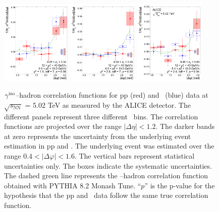 \begin{figure}
    \includegraphics[width=0.3\textwidth]{Data_Analysis/gammahadron/Cs_Final_Indv_pT_0_zT_5.pdf}        
    \includegraphics[width=0.3\textwidth]{Data_Analysis/gammahadron/Cs_Final_Indv_pT_0_zT_6.pdf}        
    \includegraphics[width=0.3\textwidth]{Data_Analysis/gammahadron/Cs_Final_Indv_pT_0_zT_7.pdf}
    \caption{$\gamma^\mathrm{iso}$--hadron correlation functions for pp (red) and \pPb~(blue) data at $\sqrt{s_\mathrm{NN}}$ = 5.02 TeV as measured by the ALICE detector. The different panels represent three different \zt~bins. The correlation functions are projected over the range $|\Delta\eta| < 1.2$. The darker bands at zero represents the uncertainty from the underlying event estimation in pp and \pPb. The underlying event was estimated over the range $0.4 <|\Delta\varphi| < 1.6$. The vertical bars represent statistical uncertainties only. The boxes indicate the systematic uncertainties. The dashed green line represents the \gammaiso--hadron correlation function obtained with \textsc{PYTHIA 8.2} Monash Tune. ``$p$'' is the p-value for the hypothesis that the pp and \pPb~data follow the same true correlation function.}
    \label{fig:GH_Correlations}
 \end{figure}
\FloatBarrier

